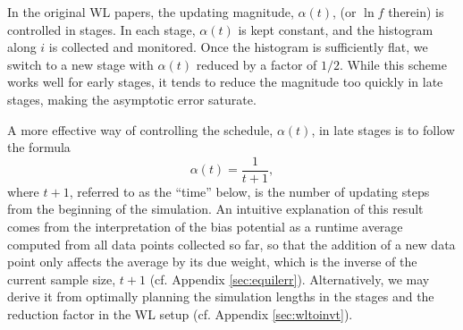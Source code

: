 \documentclass[reprint, superscriptaddress, floatfix]{revtex4-1}
\begin{document}
In the original WL papers\cite{
wang2001, *wang2001pre},
the updating magnitude, $\alpha(t)$,
(or $\ln f$ therein)
is controlled in stages.
%
In each stage, $\alpha(t)$
is kept constant,
and the histogram along $i$
is collected and monitored.
%
Once the histogram is sufficiently flat,
we switch to a new stage
with $\alpha(t)$ reduced by a factor of $1/2$\cite{
wang2001, *wang2001pre}.
%
While this scheme works well for early stages,
it tends to reduce the magnitude
too quickly in late stages, making the asymptotic error
saturate\cite{
belardinelli2007, *belardinelli2007jcp, *belardinelli2008, *belardinelli2016}.


A more effective way
of controlling the schedule, $\alpha(t)$,
in late stages
is to follow the formula
%
\begin{equation}
  \alpha(t) = \frac{1}{t + 1},
  \label{eq:alpha_invt}
\end{equation}
%
where $t + 1$,
referred to as the ``time'' below,
is the number of updating steps
from the beginning of the simulation\cite{
belardinelli2007, *belardinelli2007jcp, *belardinelli2008, *belardinelli2016,
morozov2007, zhou2008,
komura2012, *caparica2012, *caparica2014}.
%
An intuitive explanation of this result\cite{
  marsili2006, barducci2008}
comes from the interpretation of
the bias potential %
as a runtime average computed from all data points collected so far,
so that the addition of a new data point only
affects the average by its due weight,
which is the inverse of the current sample size, $t + 1$
(cf. Appendix \ref{sec:equilerr}).
%
Alternatively, we may derive it
from optimally planning the simulation lengths in the stages
and the reduction factor in the WL setup (cf. Appendix \ref{sec:wltoinvt}).

%


\end{document}
